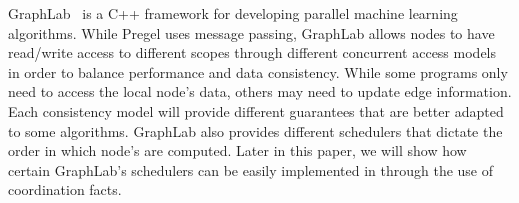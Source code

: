 GraphLab~\cite{GraphLab2010} is a C++ framework for developing parallel machine learning algorithms. While
Pregel uses message passing, GraphLab allows nodes to have read/write access to different scopes through different concurrent access models in order to balance performance and data consistency. While some programs only need to access the local node's data, others may need to update edge information. Each consistency model will provide different guarantees that are better adapted to some algorithms. GraphLab also provides different schedulers that dictate the order in which node's are computed. Later in this paper, we will show how certain GraphLab's schedulers can be easily implemented in \lang through the use of coordination facts.
